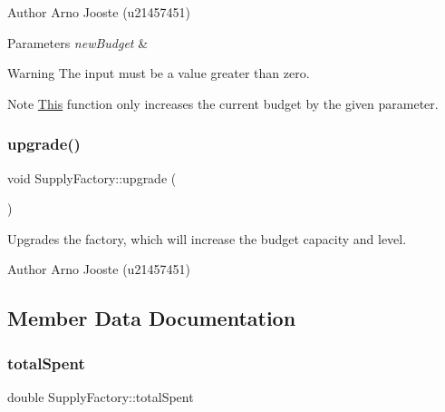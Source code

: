 \begin{DoxyAuthor}{Author}
Arno Jooste (u21457451) 
\end{DoxyAuthor}

\begin{DoxyParams}{Parameters}
{\em new\+Budget} & \\
\hline
\end{DoxyParams}
\begin{DoxyWarning}{Warning}
The input must be a value greater than zero. 
\end{DoxyWarning}
\begin{DoxyNote}{Note}
\mbox{\hyperlink{class_this}{This}} function only increases the current budget by the given parameter. 
\end{DoxyNote}
\mbox{\label{class_supply_factory_af3930f1f67a23500a56e52045d4c9f67}} 
\subsubsection{\texorpdfstring{upgrade()}{upgrade()}}
{\footnotesize\ttfamily void Supply\+Factory\+::upgrade (\begin{DoxyParamCaption}{ }\end{DoxyParamCaption})}



Upgrades the factory, which will increase the budget capacity and level. 

\begin{DoxyAuthor}{Author}
Arno Jooste (u21457451) 
\end{DoxyAuthor}


\subsection{Member Data Documentation}
\mbox{\label{class_supply_factory_a750f6f87cfc10a860862e8f36043cf94}} 
\subsubsection{\texorpdfstring{totalSpent}{totalSpent}}
{\footnotesize\ttfamily double Supply\+Factory\+::total\+Spent\hspace{0.3cm}{\ttfamily [protected]}}

